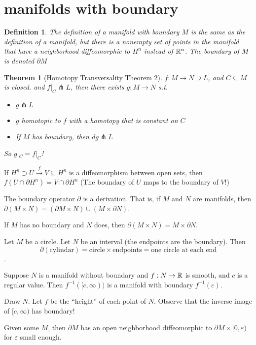 \documentclass[11pt,leqno,oneside]{amsart}
\renewcommand{\epsilon}{\varepsilon}
\renewcommand{\d}{\partial}
\newcommand{\oo}{\infty}
\newcommand{\transverse}{\pitchfork}
\newcommand{\x}{\times}
\newcommand{\de}{\emph}
\theoremstyle{mystyle} \newtheorem{thrm}[thm]{Theorem}
\theoremstyle{mystyle} \newtheorem{defi}[thm]{Definition}
\begin{document}
\section{manifolds with boundary}
\begin{defi}
	The definition of a \de{manifold with boundary} $M$ is the same as the definition of a manifold, but there is a nonempty set of points in the manifold that have a neighborhood diffeomorphic to $H^n$ instead of ${\mathbb R}^n$.  The boundary of $M$ is denoted $\d M$
\end{defi}

\begin{thrm}[Homotopy Transversality Theorem 2]
	$f: M \to N \supseteq L$, and $C \subseteq M$ is closed.
	and $f|_C \transverse L$, then there exists
	$g: M \to N$ s.t.
	\begin{itemize}
		\item $g \transverse L$
		\item $g$ homotopic to $f$ with a homotopy that is constant on $C$
		\item If $M$ has boundary, then $dg \transverse L$
	\end{itemize}
	So $g|_C = f|_C$!
\end{thrm}
\begin{lem}
	If $H^n \supset U \overset{f}{\to} V \subseteq H^n$ is a diffeomorphism between open sets, then $f( U \cap \d H^n ) = V \cap \d H^n$
	(The boundary of $U$ maps to the boundary of $V$!)
\end{lem}
\begin{prop}[Matt]
	The boundary operator $\d$ is a derivation.  That is, if $M$ and $N$ are manifolds, then $\d(M \x N) = (\d M \x N) \cup (M \x \d N)$.
\end{prop}
\begin{cor}
	If $M$ has no boundary and $N$ does, then $\d(M \x N) = M \x \d N$.
\end{cor}
\begin{example}
	Let $M$ be a circle.  Let $N$ be an interval (the endpoints are the boundary).  Then $$\d(\text{cylindar}) = \text{circle} \x \text{endpoints} = \text{one circle at each end}$$.
\end{example}
\begin{lem}
	Suppose $N$ is a manifold without boundary and $f : N \to {\mathbb R}$ is smooth, and $c$ is a regular value.  Then $f^{-1}([c,\oo))$ is a manifold with boundary $f^{-1}(c)$.
\end{lem}
\begin{example}
	Draw $N$.  Let $f$ be the ``height'' of each point of $N$.  Observe that the inverse image of $[c, \oo)$ has boundary!
\end{example}
\begin{lem}
	Given some $M$, then $\d M$ has an open neighborhood diffeomorphic to $\d M \x [0, \epsilon)$ for $\epsilon$ small enough.
\end{lem}
\end{document}
